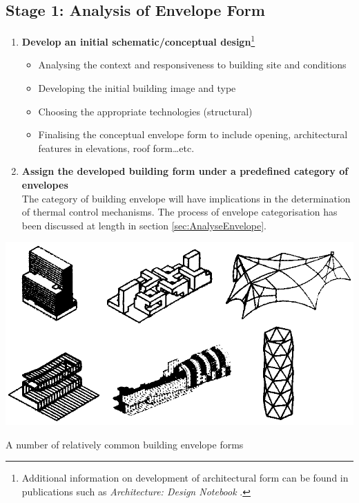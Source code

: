 \clearpage
\colorbox{95Gray}{%
	\begin{minipage}[c][20.5cm][t]{\textwidth}{%
		\subsection{Stage 1: Analysis of Envelope Form}
		\label{sec:Stage1}
		\vspace{0.5cm}
		\begin{enumerate}
			\item \textbf{Develop an initial schematic/conceptual design}\footnote{Additional information on development of architectural form can be found in publications such as \emph{Architecture: Design Notebook} \cite{fawcett03}.}
				\begin{itemize}
					\item Analysing the context and responsiveness to building site and conditions
					\item Developing the initial building image and type
					\item Choosing the appropriate technologies (structural)
					\item Finalising the conceptual envelope form to include opening, architectural features in elevations, roof form\ldots etc.
				\end{itemize}
			\vspace{0.2cm}
			\item \textbf{Assign the developed building form under a predefined category of envelopes}\\[3mm]
				The category of building envelope will have implications in the determination of thermal control mechanisms. The process of envelope categorisation has been discussed at length in section \ref{sec:AnalyseEnvelope}.
		\end{enumerate}
		\includegraphics[width=\textwidth]{./Images/23-StageA}
		\begin{center}
		\small A number of relatively common building envelope forms
		\end{center}
	}%
\end{minipage}%
}

